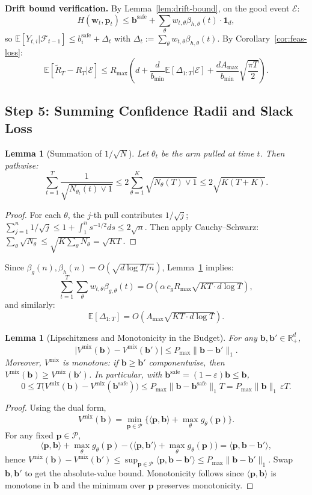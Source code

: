 \documentclass[11pt]{article}
\newtheorem{lemma}[theorem]{Lemma}
\newcommand{\bb}{\mathbf{b}}
\newcommand{\bbS}{\mathbf{b}^{\mathrm{safe}}}
\newcommand{\bp}{\mathbf{p}}
\newcommand{\bw}{\mathbf{w}}
\newcommand{\E}{\mathbb{E}}
\newcommand{\R}{\mathbb{R}}
\newcommand{\cP}{\mathcal{P}}
\newcommand{\cF}{\mathcal{F}}
\newcommand{\cE}{\mathcal{E}}
\begin{document}
\textbf{Drift bound verification.} By Lemma~\ref{lem:drift-bound}, on the good event $\cE$:
\[
H(\bw_t, \bp_t) \le \bbS + \sum_\theta w_{t,\theta} \beta_{h,\theta}(t) \cdot \mathbf{1}_d,
\]
so $\E[Y_{t,i} | \cF_{t-1}] \le b^{\mathrm{safe}}_i + \Delta_t$ with $\Delta_t := \sum_\theta w_{t,\theta} \beta_{h,\theta}(t)$. By Corollary~\ref{cor:feas-loss}:
\[
\E[\tilde{R}_T - R_T | \cE] \le R_{\max} \left( d + \frac{d}{b_{\min}} \E[\Delta_{1:T} | \cE] + \frac{d A_{\max}}{b_{\min}} \sqrt{\frac{\pi T}{2}} \right).
\]

\subsection{Step 5: Summing Confidence Radii and Slack Loss}

\begin{lemma}[Summation of $1/\sqrt{N}$]
\label{lem:sum-sqrt}
Let $\theta_t$ be the arm pulled at time $t$. Then pathwise:
\[
\sum_{t=1}^T \frac{1}{\sqrt{N_{\theta_t}(t) \vee 1}} \le 2 \sum_{\theta=1}^K \sqrt{N_\theta(T) \vee 1} \le 2\sqrt{K(T+K)}.
\]
\end{lemma}

\begin{proof}
For each $\theta$, the $j$-th pull contributes $1/\sqrt{j}$; $\sum_{j=1}^n 1/\sqrt{j} \le 1 + \int_1^n s^{-1/2} ds \le 2\sqrt{n}$. Then apply Cauchy--Schwarz: $\sum_\theta \sqrt{N_\theta} \le \sqrt{K \sum_\theta N_\theta} = \sqrt{KT}$.
\end{proof}

Since $\beta_g(n), \beta_h(n) = O(\sqrt{d \log T / n})$, Lemma~\ref{lem:sum-sqrt} implies:
\[
\sum_{t=1}^T \sum_\theta w_{t,\theta} \beta_{g,\theta}(t) = O\left( \alpha\,c_g R_{\max} \sqrt{KT \cdot d \log T} \right),
\]
and similarly:
\[
\E[\Delta_{1:T}] = O\left( A_{\max} \sqrt{KT \cdot d \log T} \right).
\]

\begin{lemma}[Lipschitzness and Monotonicity in the Budget]
\label{lem:slack-loss}
For any $\bb,\bb'\in\R_+^d$,
\[
\big|V^{\mathrm{mix}}(\bb)-V^{\mathrm{mix}}(\bb')\big|\le P_{\max}\|\bb-\bb'\|_1.
\]
Moreover, $V^{\mathrm{mix}}$ is monotone: if $\bb\ge \bb'$ componentwise, then
$V^{\mathrm{mix}}(\bb)\ge V^{\mathrm{mix}}(\bb')$.
In particular, with $\bbS=(1-\varepsilon)\bb\le \bb$,
\[
0\le T\big(V^{\mathrm{mix}}(\bb)-V^{\mathrm{mix}}(\bbS)\big)
\le P_{\max}\|\bb-\bbS\|_1 T
= P_{\max}\|\bb\|_1\,\varepsilon T.
\]
\end{lemma}

\begin{proof}
Using the dual form,
\[
V^{\mathrm{mix}}(\bb)=\min_{\bp\in\cP}\{\langle \bp,\bb\rangle+\max_\theta g_\theta(\bp)\}.
\]
For any fixed $\bp\in\cP$,
\[
\langle \bp,\bb\rangle+\max_\theta g_\theta(\bp)
-
\big(\langle \bp,\bb'\rangle+\max_\theta g_\theta(\bp)\big)
=\langle \bp,\bb-\bb'\rangle,
\]
hence
$V^{\mathrm{mix}}(\bb)-V^{\mathrm{mix}}(\bb')\le \sup_{\bp\in\cP}\langle \bp,\bb-\bb'\rangle
\le P_{\max}\|\bb-\bb'\|_1$.
Swap $\bb,\bb'$ to get the absolute-value bound.
Monotonicity follows since $\langle \bp,\bb\rangle$ is monotone in $\bb$ and the minimum over $\bp$
preserves monotonicity.
\end{proof}
\end{document}
